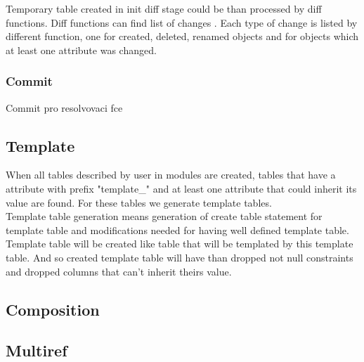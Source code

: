 \documentclass[deska]{subfiles}
\begin{document}
Temporary table created in init diff stage could be than processed by diff functions. Diff functions can find list of changes . Each type of change is listed by different function, one for created, deleted, renamed objects and for objects which at least one attribute was changed.\\

\subsubsection{Commit}
Commit pro resolvovaci fce

\subsection{Template}
When all tables described by user in modules are created, tables that have a attribute with prefix "template\_" and at least one attribute that could inherit its value are found. For these tables we generate template tables.\\
Template table generation means generation of create table statement for template table and modifications needed for having well defined template table.
Template table will be created like table that will be templated by this template table. And so created template table will have than dropped not null constraints and dropped columns that can't inherit theirs value.



\subsection{Composition}

\subsection{Multiref}
\end{document}
